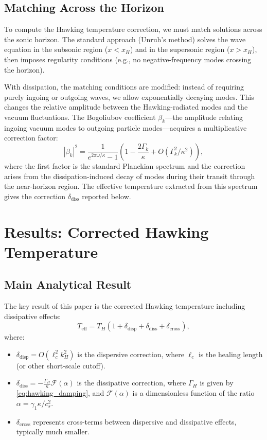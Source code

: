 \documentclass[aps,prl,twocolumn,superscriptaddress,nofootinbib,amsmath,amssymb]{revtex4-2}
\begin{document}
\subsection{Matching Across the Horizon}

To compute the Hawking temperature correction, we must match solutions across the sonic horizon. The standard approach (Unruh's method) solves the wave equation in the subsonic region ($x < x_H$) and in the supersonic region ($x > x_H$), then imposes regularity conditions (e.g., no negative-frequency modes crossing the horizon).

With dissipation, the matching conditions are modified: instead of requiring purely ingoing or outgoing waves, we allow exponentially decaying modes. This changes the relative amplitude between the Hawking-radiated modes and the vacuum fluctuations. The Bogoliubov coefficient $\beta_k$---the amplitude relating ingoing vacuum modes to outgoing particle modes---acquires a multiplicative correction factor:
\begin{equation}
|\beta_k|^2 = \frac{1}{e^{2\pi\omega/\kappa} - 1} \left(1 - \frac{2\Gamma_k}{\kappa} + O(\Gamma_k^2/\kappa^2)\right),
\end{equation}
where the first factor is the standard Planckian spectrum and the correction arises from the dissipation-induced decay of modes during their transit through the near-horizon region. The effective temperature extracted from this spectrum gives the correction $\delta_{\text{diss}}$ reported below.

\section{Results: Corrected Hawking Temperature}
\label{sec:results}

\subsection{Main Analytical Result}

The key result of this paper is the corrected Hawking temperature including dissipative effects:
\begin{equation}
\label{eq:main_result}
T_{\text{eff}} = T_H \left(1 + \delta_{\text{disp}} + \delta_{\text{diss}} + \delta_{\text{cross}} \right),
\end{equation}
where:
\begin{itemize}
\item $\delta_{\text{disp}} = O(\ell_c^2 k_H^2)$ is the dispersive correction, where $\ell_c$ is the healing length (or other short-scale cutoff).
\item $\delta_{\text{diss}} = -\frac{\Gamma_H}{\kappa} \mathcal{F}(\alpha)$ is the dissipative correction, where $\Gamma_H$ is given by \eqref{eq:hawking_damping}, and $\mathcal{F}(\alpha)$ is a dimensionless function of the ratio $\alpha = \gamma_1 \kappa / c_s^2$.
\item $\delta_{\text{cross}}$ represents cross-terms between dispersive and dissipative effects, typically much smaller.
\end{itemize}
\end{document}
